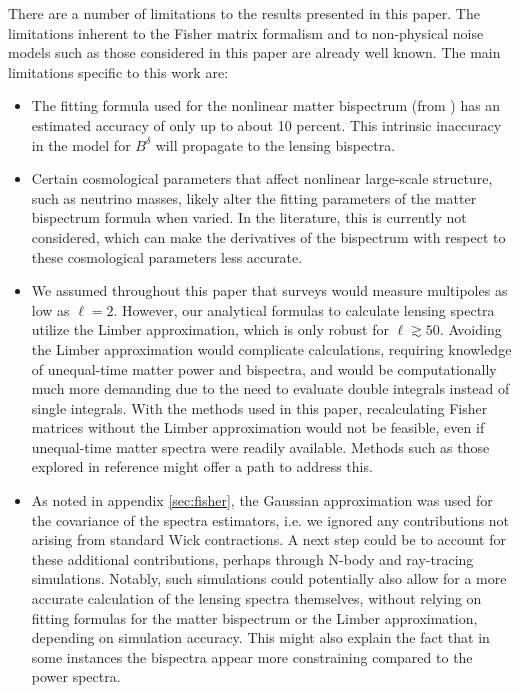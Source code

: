 \documentclass[11pt]{article} %
\begin{document}
There are a number of limitations to the results presented in this paper. The limitations inherent to the Fisher matrix formalism and to non-physical noise models such as those considered in this paper are already well known. The main limitations specific to this work are:
\begin{itemize}
     \item The fitting formula used for the nonlinear matter bispectrum (from \cite{bispfit}) has an estimated accuracy of only up to about 10 percent. This intrinsic inaccuracy in the model for $B^{\delta}$ will propagate to the lensing bispectra.
     \item Certain cosmological parameters that affect nonlinear large-scale structure, such as neutrino masses, likely alter the fitting parameters of the matter bispectrum formula when varied. In the literature, this is currently not considered, which can make the derivatives of the bispectrum with respect to these cosmological parameters less accurate.
     \item We assumed throughout this paper that surveys would measure multipoles as low as $\ell = 2$.  However, our analytical formulas to calculate lensing spectra utilize the Limber approximation, which is only robust for $\ell \gtrsim 50$. Avoiding the Limber approximation would complicate calculations, requiring knowledge of unequal-time matter power and bispectra, and would be computationally much more demanding due to the need to evaluate double integrals instead of single integrals. With the methods used in this paper, recalculating Fisher matrices without the Limber approximation would not be feasible, even if unequal-time matter spectra were readily available. Methods such as those explored in reference \cite{Chen:2021vba} might offer a path to address this.

     \item As noted in appendix \ref{sec:fisher}, the Gaussian approximation was used for the covariance of the spectra estimators, i.e. we ignored any contributions not arising from standard Wick contractions. A next step could be to account for these additional contributions, perhaps through N-body and ray-tracing simulations. Notably, such simulations could potentially also allow for a more accurate calculation of the lensing spectra themselves, without relying on fitting formulas for the matter bispectrum or the Limber approximation, depending on simulation accuracy. This might also explain the fact that in some instances the bispectra appear more constraining compared to the power spectra.  


\end{itemize}
\end{document}
